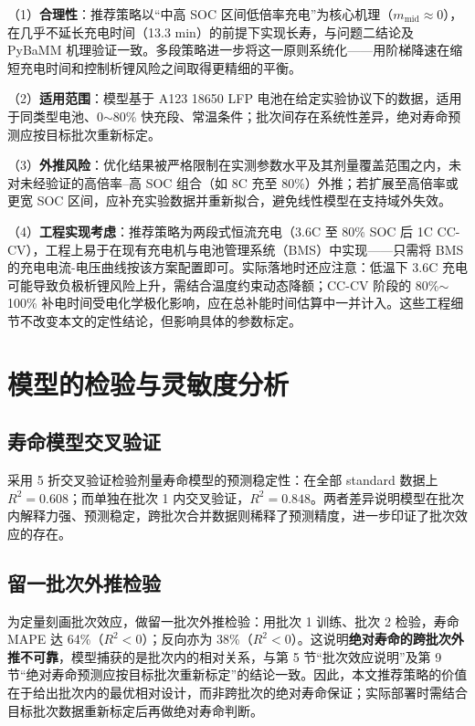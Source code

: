 \documentclass[withoutpreface]{cumcmthesis}
\begin{document}
（1）\textbf{合理性}：推荐策略以``中高 SOC 区间低倍率充电''为核心机理（$m_{\mathrm{mid}}\approx0$），在几乎不延长充电时间（13.3 min）的前提下实现长寿，与问题二结论及 PyBaMM 机理验证一致。多段策略进一步将这一原则系统化——用阶梯降速在缩短充电时间和控制析锂风险之间取得更精细的平衡。

（2）\textbf{适用范围}：模型基于 A123 18650 LFP 电池在给定实验协议下的数据，适用于同类型电池、0$\sim$80\% 快充段、常温条件；批次间存在系统性差异，绝对寿命预测应按目标批次重新标定。

（3）\textbf{外推风险}：优化结果被严格限制在实测参数水平及其剂量覆盖范围之内，未对未经验证的高倍率--高 SOC 组合（如 8C 充至 80\%）外推；若扩展至高倍率或更宽 SOC 区间，应补充实验数据并重新拟合，避免线性模型在支持域外失效。

（4）\textbf{工程实现考虑}：推荐策略为两段式恒流充电（3.6C 至 80\% SOC 后 1C CC-CV），工程上易于在现有充电机与电池管理系统（BMS）中实现——只需将 BMS 的充电电流-电压曲线按该方案配置即可。实际落地时还应注意：低温下 3.6C 充电可能导致负极析锂风险上升，需结合温度约束动态降额；CC-CV 阶段的 80\%$\sim$100\% 补电时间受电化学极化影响，应在总补能时间估算中一并计入。这些工程细节不改变本文的定性结论，但影响具体的参数标定。

\section{模型的检验与灵敏度分析}

\subsection{寿命模型交叉验证}

采用 5 折交叉验证检验剂量寿命模型的预测稳定性：在全部 standard 数据上 $R^2=0.608$；而单独在批次 1 内交叉验证，$R^2=0.848$。两者差异说明模型在批次内解释力强、预测稳定，跨批次合并数据则稀释了预测精度，进一步印证了批次效应的存在。

\subsection{留一批次外推检验}

为定量刻画批次效应，做留一批次外推检验：用批次 1 训练、批次 2 检验，寿命 MAPE 达 64\%（$R^2<0$）；反向亦为 38\%（$R^2<0$）。这说明\textbf{绝对寿命的跨批次外推不可靠}，模型捕获的是批次内的相对关系，与第 5 节“批次效应说明”及第 9 节“绝对寿命预测应按目标批次重新标定”的结论一致。因此，本文推荐策略的价值在于给出批次内的最优相对设计，而非跨批次的绝对寿命保证；实际部署时需结合目标批次数据重新标定后再做绝对寿命判断。
\end{document}

